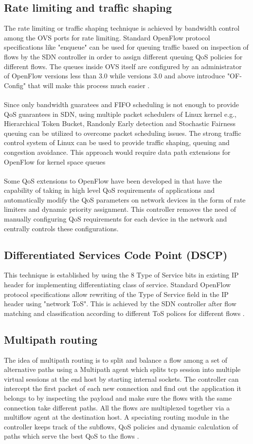 \documentclass[paper=a4, fontsize=12pt]{scrartcl}	%
\numberwithin{equation}{section}		%
\numberwithin{figure}{section}			%
\numberwithin{table}{section}				%
\begin{document}
\subsection{Rate limiting and traffic shaping}
The rate limiting or traffic shaping technique is achieved by bandwidth control among the OVS ports for rate limiting. Standard OpenFlow protocol specifications like "enqueue" can be used for queuing traffic based on inspection of flows by the SDN controller in order to assign different queuing QoS policies for different flows. The queues inside OVS itself are configured by an administrator of OpenFlow versions less than 3.0 while versions 3.0 and above introduce "OF-Config" that will make this process much easier \cite{bigswitch}. 
\\
\\
Since only bandwidth guaratees and FIFO scheduling is not enough to provide QoS guarantees in SDN, using multiple packet schedulers of Linux kernel e.g., Hierarchical Token Bucket, Randonly Early detection and Stochastic Fairness queuing can be utilized to overcome packet scheduling issues. The strong traffic control system of Linux can be used to provide traffic shaping, queuing and congestion avoidance. This approach would require data path extensions for OpenFlow for kernel space queues \cite{scheduler}
\\
\\
Some QoS extensions to OpenFlow have been developed in \cite{convergence} that have the capability of taking in high level QoS requirements of applications and automatically modify the QoS parameters on network devices in the form of rate limiters and dynamic priority assignment. This controller removes the need of manually configuring QoS requirements for each device in the network and centrally controls these configurations. 
\subsection{Differentiated Services Code Point (DSCP)}
This technique is established by using the 8 Type of Service bits in existing IP header for implementing differentiating class of service. Standard OpenFlow protocol specifications allow rewriting of the Type of Service field in the IP header using "network ToS". This is achieved by the SDN controller after flow matching and classification according to different ToS polices for different flows \cite{bigswitch}.
\subsection{Multipath routing}
The idea of multipath routing is to split and balance a flow among a set of alternative paths using a Multipath agent which splits tcp session into multiple virtual sessions at the end host by starting internal sockets. The controller can intercept the first packet of each new connection and find out the application it belongs to by inspecting the payload and make sure the flows with the same connection take different paths. All the flows are multiplexed together via a multiflow agent at the destination host. A speciating routing module in the controller keeps track of the subflows, QoS policies and dynamic calculation of paths which serve the best QoS to the flows \cite{multipath}.
\end{document}
